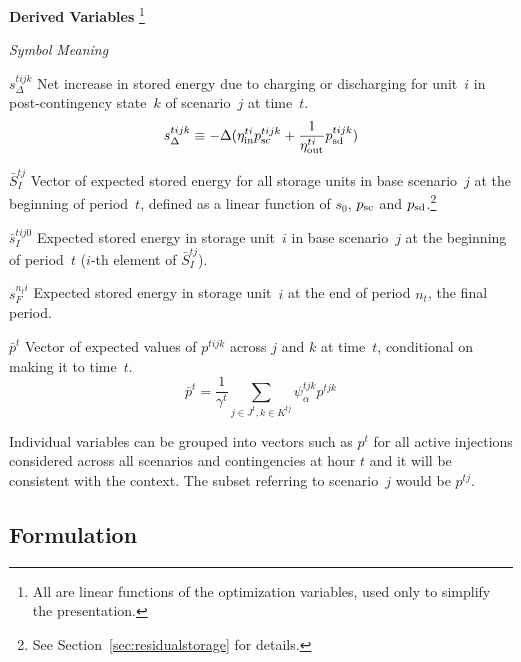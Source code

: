\documentclass[12pt]{article}
\newcommand{\namelistlabel}[1]{\mbox{#1}\hfil}
\newenvironment{namelist}[1]{%
\begin{list}{}
  {
    \let\makelabel\namelistlabel
    \settowidth{\labelwidth}{#1}
    \setlength{\leftmargin}{1.1\labelwidth}
  }
 }{%
\end{list}}
\numberwithin{equation}{section}
\numberwithin{table}{section}
\numberwithin{figure}{section}
\begin{document}
\begin{namelist}{XXXXXXXXXX}
\item[]
\item[{\bf Derived Variables}]\footnote{All are linear functions of the optimization variables, used only to simplify the presentation.}
\item[\emph{Symbol}] \emph{Meaning}
\item[$s_\Delta^{tijk}$] Net increase in stored energy due to charging or discharging for unit~$i$ in post-contingency state~$k$ of scenario~$j$ at time~$t$.
\begin{equation}
s_\Delta^{tijk} \equiv - \Delta(\eta^{ti}_{\rm in} p^{tijk}_{\rm sc} + \frac{1}{\eta^{ti}_{\rm out}} p_{\rm sd}^{tijk}) \label{eq:sdelta}
\end{equation}
\item[$\bar{S}_I^{tj}$] Vector of expected stored energy for all storage units in base scenario~$j$ at the beginning of period~$t$, defined as a linear function of $s_0$, $p_{\rm sc}$ and $p_{\rm sd}$.\footnote{See Section~\ref{sec:residualstorage} for details.}
\item[$\bar{s}_I^{tij0}$] Expected stored energy in storage unit~$i$ in base scenario~$j$ at the beginning of period~$t$ ($i$-th element of $\bar{S}_I^{tj}$).
\item[$s_F^{n_ti}$] Expected stored energy in storage unit~$i$ at the end of period $n_t$, the final period.\footnotemark[\value{footnote}]
\item[$\bar{p}^t$] Vector of expected values of $p^{tijk}$ across $j$ and $k$ at time~$t$, conditional on making it to time~$t$.
\begin{equation}
 \bar{p}^t = \frac{1}{\gamma^t} \sum_{j \in J^t, k \in K^{tj}} \!\!\! \psi_\alpha^{tjk} p^{tjk} \label{eq:expected_dispatch}
\end{equation}


\end{namelist}
Individual variables can be grouped into vectors such as $p^{t}$ for all active injections considered across all scenarios and contingencies at hour $t$ and it will be consistent with the context. The subset referring to scenario~$j$ would be $p^{tj}$.

\clearpage
\subsection{Formulation}
\label{sec:formulation}
\end{document}
